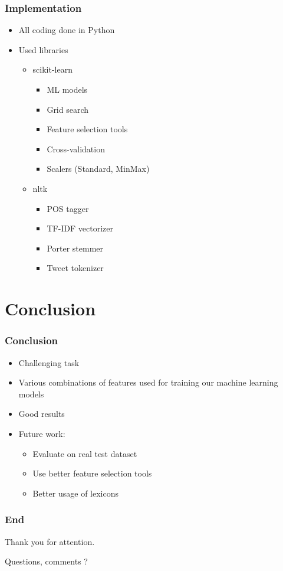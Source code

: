 \documentclass[slidestop,compress,11pt,xcolor=dvipsnames]{beamer}
\begin{document}
\begin{frame}[fragile] %
\frametitle{Implementation}
\begin{itemize}
\setlength\itemsep{2mm}
	\item All coding done in Python
	\item Used libraries
	\begin{itemize}
	\vspace{1mm}
	\setlength\itemsep{2mm}
		\item scikit-learn
		\begin{itemize}
			\item ML models
			\item Grid search
			\item Feature selection tools
			\item Cross-validation
			\item Scalers (Standard, MinMax)
		\end{itemize}
		\item nltk
		\begin{itemize}
			\item POS tagger
			\item TF-IDF vectorizer
			\item Porter stemmer
			\item Tweet tokenizer
		\end{itemize}
	\end{itemize}
\end{itemize}


\end{frame}

\section{Conclusion}

\begin{frame}
\frametitle{Conclusion}
\begin{itemize}
\setlength\itemsep{2mm}
	\item Challenging task
	\item Various combinations of features used for training our machine learning models
	\item Good results
	\item Future work:
	\begin{itemize}
		\item Evaluate on real test dataset
		\item Use better feature selection tools
		\item Better usage of lexicons
	\end{itemize}
\end{itemize}
\end{frame}


\begin{frame}
\vspace{1.25cm}
\frametitle{End}
\centerline{Thank you for attention.}
\vspace{0.5cm}
\centerline{Questions, comments ?}
\end{frame}

\end{document}
